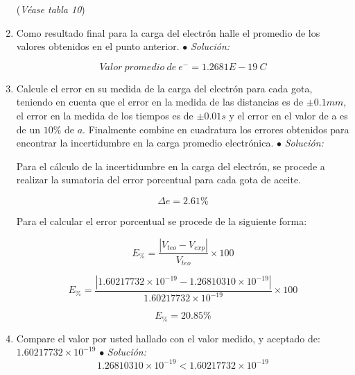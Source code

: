 \documentclass{article}
\begin{document}
\begin{enumerate}
(\emph{Véase tabla 10})


    \item Como resultado final para la carga del electrón halle el promedio de los valores obtenidos en el punto anterior.\newline
$\bullet$ \emph{Solución: }\newline

\begin{equation}
    Valor \ promedio \ de \ e^{-}=1.2681E-19 \ C 
\end{equation}

    \item Calcule el error en su medida de la carga del electrón para cada gota, teniendo en cuenta que el error en la medida de las distancias es de $\pm 0.1 mm$, el error en la medida de los tiempos es de $\pm0.01 s$ y el error en 
    el valor de a es de un $10\%$ de $a$. Finalmente combine en cuadratura los errores obtenidos para encontrar la incertidumbre en la carga promedio electrónica.\newline
$\bullet$ \emph{Solución: }\newline

Para el cálculo de la incertidumbre en la carga del electrón, se procede a realizar la sumatoria del error porcentual para cada gota de aceite.

\begin{equation}
    \Delta e=2.61\%
\end{equation}

Para el calcular el error porcentual se procede de la siguiente forma:

\begin{equation}
    E_{\%}=\frac{|V_{teo}-V_{exp}|}{V_{teo}}\times 100
\end{equation}

\begin{equation}
    E_{\%}=\frac{|1.60217732\times 10^{-19}-1.26810310\times10^{-19}|}{1.60217732\times 10^{-19}}\times 100
\end{equation}

\begin{equation}
    E_{\%}=20.85\%
\end{equation}


    \item Compare el valor por usted hallado con el valor medido, y aceptado de: $1.60217732\times10^{-19}$\newline
$\bullet$ \emph{Solución: }\newline
\begin{equation}
    1.26810310\times10^{-19} < 1.60217732\times10^{-19} 
\end{equation}





\end{enumerate}
\end{document}

